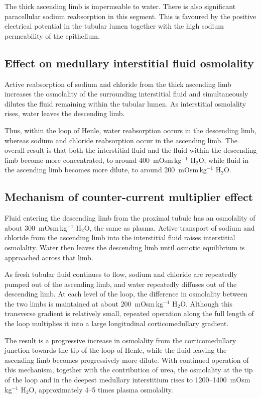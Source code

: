 \documentclass[11pt,a4paper]{article}
\begin{document}
The thick ascending limb is impermeable to water. There is also significant paracellular sodium reabsorption in this segment. This is favoured by the positive electrical potential in the tubular lumen together with the high sodium permeability of the epithelium.

\subsection{Effect on medullary interstitial fluid osmolality}

Active reabsorption of sodium and chloride from the thick ascending limb increases the osmolality of the surrounding interstitial fluid and simultaneously dilutes the fluid remaining within the tubular lumen. As interstitial osmolality rises, water leaves the descending limb.

Thus, within the loop of Henle, water reabsorption occurs in the descending limb, whereas sodium and chloride reabsorption occur in the ascending limb. The overall result is that both the interstitial fluid and the fluid within the descending limb become more concentrated, to around 400~mOsm\,kg$^{-1}$ H$_2$O, while fluid in the ascending limb becomes more dilute, to around 200~mOsm\,kg$^{-1}$ H$_2$O.

\subsection{Mechanism of counter-current multiplier effect}

Fluid entering the descending limb from the proximal tubule has an osmolality of about 300~mOsm\,kg$^{-1}$ H$_2$O, the same as plasma. Active transport of sodium and chloride from the ascending limb into the interstitial fluid raises interstitial osmolality. Water then leaves the descending limb until osmotic equilibrium is approached across that limb.

As fresh tubular fluid continues to flow, sodium and chloride are repeatedly pumped out of the ascending limb, and water repeatedly diffuses out of the descending limb. At each level of the loop, the difference in osmolality between the two limbs is maintained at about 200~mOsm\,kg$^{-1}$ H$_2$O. Although this transverse gradient is relatively small, repeated operation along the full length of the loop multiplies it into a large longitudinal corticomedullary gradient.

The result is a progressive increase in osmolality from the corticomedullary junction towards the tip of the loop of Henle, while the fluid leaving the ascending limb becomes progressively more dilute. With continued operation of this mechanism, together with the contribution of urea, the osmolality at the tip of the loop and in the deepest medullary interstitium rises to 1200--1400~mOsm\,kg$^{-1}$ H$_2$O, approximately 4--5 times plasma osmolality.
\end{document}
